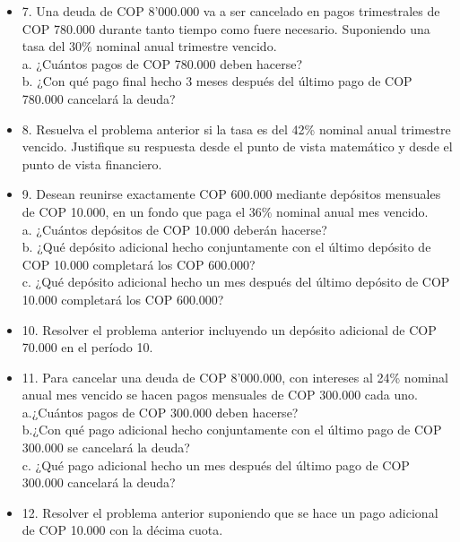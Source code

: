 \begin{itemize}
 \item 7. Una deuda de COP 8'000.000 va a ser cancelado en pagos trimestrales de COP 780.000 durante tanto tiempo como fuere necesario. Suponiendo una tasa del 30\% nominal anual trimestre vencido.\\
       a. ¿Cuántos pagos de COP 780.000 deben hacerse?\\
       b. ¿Con qué pago final hecho 3 meses después del último pago de COP 780.000 cancelará la deuda?\\
       \medskip

 \item 8. Resuelva el problema anterior si la tasa es del 42\% nominal anual trimestre vencido. Justifique su respuesta desde el punto de vista matemático y desde el punto de vista financiero.\\
       \medskip

 \item 9. Desean reunirse exactamente COP 600.000 mediante depósitos mensuales de COP 10.000, en un fondo que paga el 36\% nominal anual mes vencido.\\
       a. ¿Cuántos depósitos de COP 10.000 deberán hacerse?\\
       b. ¿Qué depósito adicional hecho conjuntamente con el último depósito de COP 10.000 completará los COP 600.000?\\
       c. ¿Qué depósito adicional hecho un mes después del último depósito de COP 10.000 completará los COP 600.000?\\
       \medskip
 \item 10. Resolver el problema anterior incluyendo un depósito adicional de COP 70.000 en el período 10.\\
       \medskip

 \item 11. Para cancelar una deuda de COP 8'000.000, con intereses al 24\% nominal anual mes vencido se hacen pagos mensuales de COP 300.000 cada uno.\\
       a.¿Cuántos pagos de COP 300.000 deben hacerse?\\
       b.¿Con qué pago adicional hecho conjuntamente con el último pago de COP 300.000 se cancelará la deuda?\\
       c. ¿Qué pago adicional hecho un mes después del último pago de COP 300.000 cancelará la deuda?\\
       \medskip

 \item 12. Resolver el problema anterior suponiendo que se hace un pago adicional de COP 10.000 con la décima cuota.\\
       \medskip


\end{itemize}
